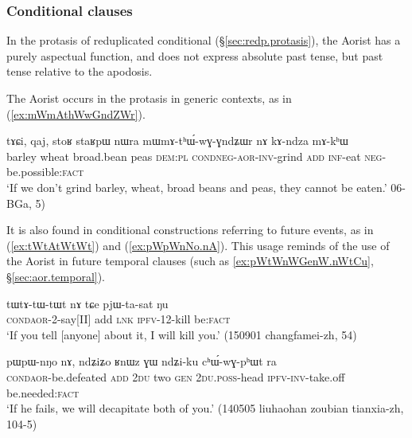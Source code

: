 \subsubsection{Conditional clauses }   \label{sec:aor.cond}
In the protasis of reduplicated conditional (§\ref{sec:redp.protasis}), the Aorist has a purely aspectual function, and does not express absolute past tense, but past tense relative to the apodosis.

The Aorist occurs in the protasis in generic contexts, as in (\ref{ex:mWmAthWwGndZWr}).

\begin{exe}
\ex \label{ex:mWmAthWwGndZWr}
 \gll tɤɕi, qaj, stoʁ staʁpɯ nɯra mɯ\redp{}mɤ-tʰɯ́-wɣ-ɣndʑɯr nɤ kɤ-ndza mɤ-kʰɯ \\
 barley wheat broad.bean peas \textsc{dem}:\textsc{pl} \textsc{cond}\redp{}\textsc{neg}-\textsc{aor}-\textsc{inv}-grind \textsc{add} \textsc{inf}-eat \textsc{neg}-be.possible:\textsc{fact} \\
 \glt `If we don't grind barley, wheat, broad beans and peas, they cannot be eaten.' 06-BGa, 5)
\end{exe}

It is also found in conditional constructions referring to future events, as in (\ref{ex:tWtAtWtWt}) and (\ref{ex:pWpWnNo.nA}). This usage reminds of the use of the Aorist in future temporal clauses (such as \ref{ex:pWtWnWGenW.nWtCu}, §\ref{sec:aor.temporal}).

\begin{exe}
\ex \label{ex:tWtAtWtWt}
 \gll  tɯ\redp{}tɤ-tɯ-tɯt nɤ tɕe pjɯ-ta-sat ŋu \\
 \textsc{cond}\redp{}\textsc{aor}-2-say[II] add \textsc{lnk} \textsc{ipfv}-1\fl{}2-kill be:\textsc{fact} \\
 \glt `If you tell [anyone] about it, I will kill you.' (150901 changfamei-zh, 54)
\end{exe}

\begin{exe}
\ex \label{ex:pWpWnNo.nA}
\gll pɯ\redp{}pɯ-nŋo nɤ, ndʑiʑo ʁnɯz ɣɯ ndʑi-ku cʰɯ́-wɣ-pʰɯt ra \\
 \textsc{cond}\redp{}\textsc{aor}-be.defeated \textsc{add} \textsc{2du} two \textsc{gen} \textsc{2du}.\textsc{poss}-head \textsc{ipfv}-\textsc{inv}-take.off be.needed:\textsc{fact} \\
 \glt `If he fails, we will decapitate both of you.' (140505 liuhaohan zoubian tianxia-zh, 104-5)
\end{exe}

